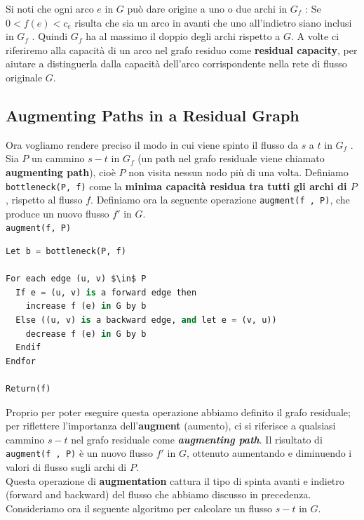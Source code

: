 Si noti che ogni arco $e$ in $G$ può dare origine a uno o due archi
in $G_f$ : Se $0 < f (e) < c_e$ risulta che sia un arco in avanti
che uno all'indietro siano inclusi in $G_f$ . Quindi $G_f$ ha al
massimo il doppio degli archi rispetto a $G$. A volte ci riferiremo
alla capacità di un arco nel grafo residuo come \textbf{residual
	capacity}, per aiutare a distinguerla dalla capacità dell'arco
corrispondente nella rete di flusso originale $G$.


\subsection{Augmenting Paths in a Residual Graph}

Ora vogliamo rendere preciso il modo in cui viene spinto il flusso da
$s$ a $t$ in $G_f$ . Sia $P$ un cammino $s-t$ in $G_f$ (un
path nel grafo residuale viene chiamato \textbf{augmenting path}), cioè
$P$ non visita nessun nodo più di una volta. Definiamo
\texttt{bottleneck(P,\ f)} come la \textbf{minima capacità residua tra
	tutti gli archi di $P$}, rispetto al flusso $f$. Definiamo ora la
seguente operazione \texttt{augment(f\ ,\ P)}, che produce un nuovo
flusso $f'$ in $G$.\\

\texttt{augment(f, P)}

\begin{lstlisting}[language=Python, mathescape=true]
 Let b = bottleneck(P, f)

For each edge (u, v) $\in$ P
  If e = (u, v) is a forward edge then
    increase f (e) in G by b
  Else ((u, v) is a backward edge, and let e = (v, u))
    decrease f (e) in G by b
  Endif
Endfor

Return(f)

\end{lstlisting}

Proprio per poter eseguire questa operazione abbiamo deﬁnito il grafo
residuale; per riflettere l'importanza dell'\textbf{augment} (aumento),
ci si riferisce a qualsiasi cammino $s-t$ nel grafo residuale come
\textbf{\emph{augmenting path}}. Il risultato di
\texttt{augment(f\ ,\ P)} è un nuovo flusso $f'$ in $G$, ottenuto
aumentando e diminuendo i valori di flusso sugli archi di $P$.\\

Questa operazione di \textbf{augmentation} cattura il tipo di spinta
avanti e indietro (forward and backward) del flusso che abbiamo discusso
in precedenza. Consideriamo ora il seguente algoritmo per calcolare un
flusso $s-t$ in $G$.\\

